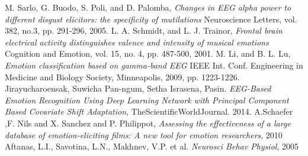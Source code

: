 \documentclass[10pt,journal,compsoc,twoside]{IEEEtran}
\begin{document}
\begin{thebibliography}{99}
 M. Sarlo, G. Buodo, S. Poli, and D. Palomba, \textit{Changes in EEG alpha
power to different disgust elicitors: the specificity of mutilations}
Neuroscience Letters, vol. 382, no.3, pp. 291-296, 2005.
 L. A. Schmidt, and L. J. Trainor, \textit{Frontal brain electrical activity
distinguishes valence and intensity of musical emotions} Cognition
and Emotion, vol. 15, no. 4, pp. 487-500, 2001.
M. Li, and B. L. Lu, \textit{Emotion classification based on gamma-band
EEG} IEEE Int. Conf. Engineering in Medicine and Biology Society,
Minneapolis, 2009, pp. 1223-1226.
Jirayucharoensak, Suwicha  Pan-ngum, Setha  Israsena, Pasin. \textit{EEG-Based Emotion Recognition Using Deep Learning Network with Principal Component Based Covariate Shift Adaptation}, TheScientificWorldJournal. 2014. 
A.Schaefer ,F. Nils  and  X. Sanchez  and  P. Philippot,
\textit{Assessing the effectiveness of a large database of emotion-eliciting films: A new tool for emotion researchers}, 2010
Aftanas, L.I., Savotina, L.N., Makhnev, V.P. et al.\textit{ Neurosci Behav Physiol}, 2005

\end{thebibliography}
\end{document}

